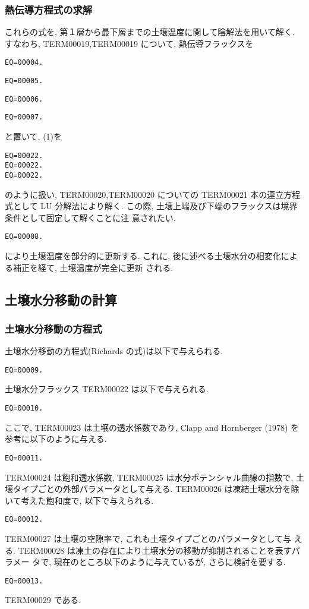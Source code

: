 \subsubsection{熱伝導方程式の求解}

これらの式を, 第１層から最下層までの土壌温度に関して陰解法を用いて解く.
すなわち, TERM00019,TERM00019 について, 熱伝導フラックスを
\begin{verbatim}
EQ=00004.
\end{verbatim}
\begin{verbatim}
EQ=00005.
\end{verbatim}
\begin{verbatim}
EQ=00006.
\end{verbatim}
\begin{verbatim}
EQ=00007.
\end{verbatim}
と置いて, (1)を
\begin{verbatim}
EQ=00022.
EQ=00022.
EQ=00022.
\end{verbatim}
のように扱い, TERM00020,TERM00020 についての
TERM00021 本の連立方程式として LU 分解法により解く.
この際, 土壌上端及び下端のフラックスは境界条件として固定して解くことに注
意されたい.
\begin{verbatim}
EQ=00008.
\end{verbatim}
により土壌温度を部分的に更新する.
これに, 後に述べる土壌水分の相変化による補正を経て, 土壌温度が完全に更新
される.

\subsection{土壌水分移動の計算}

\subsubsection{土壌水分移動の方程式}

土壌水分移動の方程式(Richards の式)は以下で与えられる.
\begin{verbatim}
EQ=00009.
\end{verbatim}

土壌水分フラックス TERM00022 は以下で与えられる.
\begin{verbatim}
EQ=00010.
\end{verbatim}
ここで, TERM00023 は土壌の透水係数であり, Clapp and Hornberger
(1978) を参考に以下のように与える.
\begin{verbatim}
EQ=00011.
\end{verbatim}
TERM00024 は飽和透水係数, TERM00025 は水分ポテンシャル曲線の指数で,
土壌タイプごとの外部パラメータとして与える.
TERM00026 は凍結土壌水分を除いて考えた飽和度で, 以下で与えられる.
\begin{verbatim}
EQ=00012.
\end{verbatim}
TERM00027 は土壌の空隙率で, これも土壌タイプごとのパラメータとして与
える. TERM00028 は凍土の存在により土壌水分の移動が抑制されることを表すパラメー
タで, 現在のところ以下のように与えているが, さらに検討を要する.
\begin{verbatim}
EQ=00013.
\end{verbatim}
TERM00029 である.

